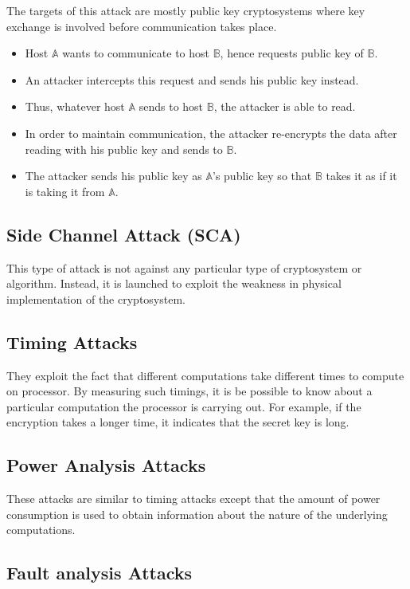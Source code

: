 \documentclass[british]{report}
\begin{document}
The targets of this attack are mostly public key cryptosystems where
key exchange is involved before communication takes place.
\begin{itemize}
	\item Host $\mathbb{A}$ wants to communicate to host $\mathbb{B}$, hence
	      requests public key of $\mathbb{B}$.
	\item An attacker intercepts this request and sends his public key instead.
	\item Thus, whatever host $\mathbb{A}$ sends to host $\mathbb{B}$, the
	      attacker is able to read.
	\item In order to maintain communication, the attacker re-encrypts the data
	      after reading with his public key and sends to $\mathbb{B}$.
	\item The attacker sends his public key as $\mathbb{A}$'s public key so
	      that $\mathbb{B}$ takes it as if it is taking it from $\mathbb{A}$.
\end{itemize}

\subsection{Side Channel Attack (SCA)}

This type of attack is not against any particular type of cryptosystem
or algorithm. Instead, it is launched to exploit the weakness in physical
implementation of the cryptosystem.

\subsection{Timing Attacks}

They exploit the fact that different computations take different times
to compute on processor. By measuring such timings, it is be possible
to know about a particular computation the processor is carrying out.
For example, if the encryption takes a longer time, it indicates that
the secret key is long.

\subsection{Power Analysis Attacks}

These attacks are similar to timing attacks except that the amount
of power consumption is used to obtain information about the nature
of the underlying computations.

\subsection{Fault analysis Attacks}
\end{document}
